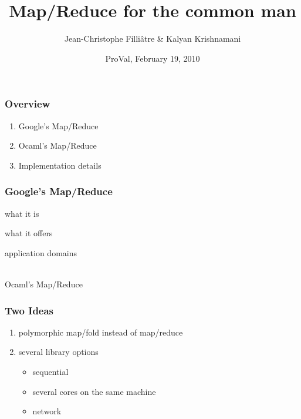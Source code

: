 \documentclass{beamer}
\let\emph\alert
\begin{document}
\title{Map/Reduce for the common man}
\author[Jean-Christophe]{Jean-Christophe Filli\^atre \& Kalyan Krishnamani}
\institute{
}
\date{ProVal, February 19, 2010}

\begin{frame}
  \titlepage
  \hfill
  \hfill
  \hfill
\end{frame}

\begin{frame}\frametitle{Overview}
  \begin{enumerate}
  \item Google's Map/Reduce
  \item Ocaml's Map/Reduce
  \item Implementation details
  \end{enumerate}
\end{frame}

\begin{frame}\frametitle{Google's Map/Reduce}
  what it is

  what it offers

  application domains

\end{frame}

\begin{frame}
  \begin{center}
    \hrulefill\\
    \emph{Ocaml's Map/Reduce}
  \end{center}
\end{frame}

\begin{frame}\frametitle{Two Ideas}
  \begin{enumerate}
  \item polymorphic map/fold instead of map/reduce

    \bigskip
  \item several library options
    \begin{itemize}
    \item sequential 
    \item several cores on the same machine
    \item network
    \end{itemize}
  \end{enumerate}
\end{frame}
\end{document}
